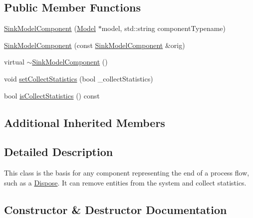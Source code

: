\subsection*{Public Member Functions}
\begin{DoxyCompactItemize}
\item 
\hyperlink{class_sink_model_component_ababdd2be9dfbe387c97bc2e4e4b72905}{Sink\+Model\+Component} (\hyperlink{class_model}{Model} $\ast$model, std\+::string component\+Typename)
\item 
\hyperlink{class_sink_model_component_a9074380d87e73a31df7cec56884d99da}{Sink\+Model\+Component} (const \hyperlink{class_sink_model_component}{Sink\+Model\+Component} \&orig)
\item 
virtual \hyperlink{class_sink_model_component_ae2e67a7f5e9078eedcf168b0fd27cb8c}{$\sim$\+Sink\+Model\+Component} ()
\item 
void \hyperlink{class_sink_model_component_af7ece39b496cfb6da23ebb598a476e76}{set\+Collect\+Statistics} (bool \+\_\+collect\+Statistics)
\item 
bool \hyperlink{class_sink_model_component_ab41fead68af669b8bd497427cd1cf884}{is\+Collect\+Statistics} () const 
\end{DoxyCompactItemize}
\subsection*{Additional Inherited Members}


\subsection{Detailed Description}
This class is the basis for any component representing the end of a process flow, such as a \hyperlink{class_dispose}{Dispose}. It can remove entities from the system and collect statistics. 

\subsection{Constructor \& Destructor Documentation}
